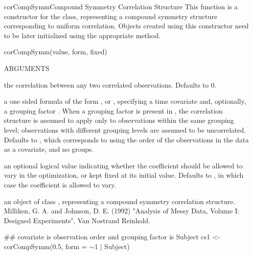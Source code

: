 \documentclass[pdftex]{article} \usepackage{url,graphicx}
\renewcommand{\Twiddle}{\mbox{\(\sim\)}}
\begin{document}
\begin{Helpfile}{corCompSymm}{Compound Symmetry Correlation Structure}
This function is a constructor for the  class,
representing a compound symmetry structure corresponding to uniform
correlation. Objects created using this constructor need to be later
initialized using the appropriate  method.
\begin{Example}
corCompSymm(value, form, fixed)
\end{Example}
\begin{Argument}{ARGUMENTS}
\item[\Co{value:}]
the correlation between any two correlated
observations. Defaults to 0.
\item[\Co{form:}]
a one sided formula of the form \Co{\Twiddle t}, or \Co{\Twiddle t |
g}, specifying a time covariate  and,  optionally, a
grouping factor . When a grouping factor is present in
, the correlation structure is assumed to apply only
to observations within the same grouping level; observations with
different grouping levels are assumed to be uncorrelated. Defaults to
\Co{\Twiddle 1}, which corresponds to using the order of the observations
in the data as a covariate, and no groups.
\item[\Co{fixed:}]
an optional logical value indicating whether the
coefficient should be allowed to vary in the optimization, or kept
fixed at its initial value. Defaults to , in which case
the coefficient is allowed to vary.
\end{Argument}
an object of class , representing a compound
symmetry correlation structure.
Milliken, G. A. and Johnson, D. E. (1992) "Analysis of Messy Data,
Volume I: Designed Experiments", Van Nostrand Reinhold.
\need 15pt
\vspace{-16pt} 
\begin{Example}
## covariate is observation order and grouping factor is Subject
cs1 <- corCompSymm(0.5, form = \Twiddle 1 | Subject)
\end{Example}
\end{Helpfile}
\end{document}
